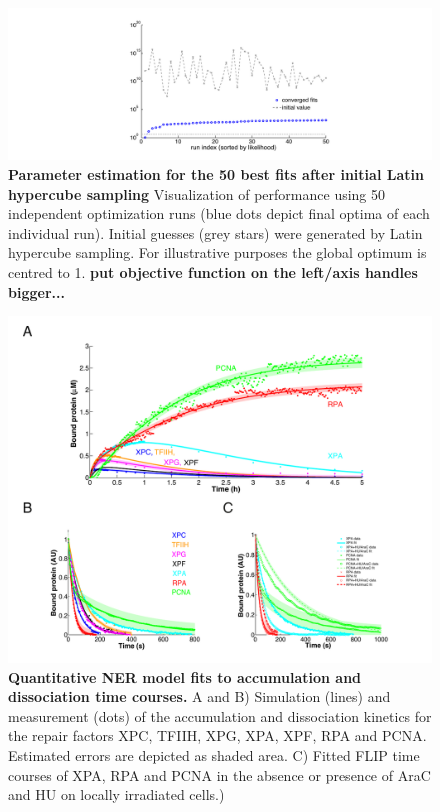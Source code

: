 \begin{figure}[htbp]
\begin{center}
\includegraphics[width=1\textwidth]{Abbildungen/figure2_6_4.pdf}
\caption{\textbf{Parameter estimation for the 50 best fits after initial Latin hypercube sampling} Visualization of performance using 50 independent optimization runs (blue dots depict final optima of each individual run). Initial guesses (grey stars) were generated by Latin hypercube sampling. For illustrative purposes the global optimum is centred to 1. \textbf{put objective function on the left/axis handles bigger...} }
\label{fig:LHS}
\end{center}
\end{figure} 

\begin{figure}[htbp]
\begin{center}
\includegraphics[width=1\textwidth]{Abbildungen/figure2_6.pdf}
\caption{\textbf{Quantitative NER model fits to accumulation and dissociation time courses.} A and B) Simulation (lines) and measurement (dots) of the accumulation and dissociation kinetics for the repair factors XPC, TFIIH, XPG, XPA, XPF, RPA and PCNA. Estimated errors are depicted as shaded area. C) Fitted FLIP time courses of XPA, RPA and PCNA in the absence or presence of AraC and HU on locally irradiated cells.)}
\label{fig:ModelFit_accu_flip}
\end{center}
\end{figure}


